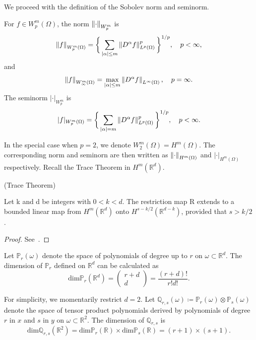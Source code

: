 We proceed with the definition of the Sobolev norm and seminorm.
\begin{defn}\label{def:sobolevnorm}
For $f \in W^m_p(\Omega)$, the norm $\left\lVert\cdot\right\rVert_{W^m_p}$ is
\begin{equation}
\left\lVert f\right\rVert_{W^m_p(\Omega)} = \bigg\{ \sum_{\lvert \alpha \rvert \leq m} \left\lVert D^\alpha f\right\rVert^p_{L^p(\Omega)} \bigg\}^{1/p}, \quad p < \infty,
\end{equation}
and 
\begin{equation}
\left\lVert f\right\rVert_{W^m_\infty(\Omega)} = \max_{\lvert \alpha \rvert \leq m} \left\lVert D^\alpha f\right\rVert_{L^\infty(\Omega)} , \quad p = \infty.
\end{equation}
The seminorm $\lvert \cdot \rvert_{W^m_p}$ is
\begin{equation}
\lvert f \rvert_{W^m_p(\Omega)} = \bigg\{ \sum_{\lvert \alpha \rvert = m} \left\lVert D^\alpha f\right\rVert^p_{L^p(\Omega)} \bigg\}^{1/p}, \quad p < \infty.
\end{equation}
\end{defn}
In the special case when $p=2$, we denote $W^m_2(\Omega) = H^m(\Omega)$. The corresponding norm and seminorn are then written as
$\left\lVert\cdot\right\rVert_{H^m(\Omega)}$ and $\lvert \cdot \rvert_{H^m(\Omega)}$ respectively.
Recall the Trace Theorem in $H^m(\mathbb{R}^d)$.
\begin{thm}\label{thm:tracethm}
(Trace Theorem)

Let k and d be integers with $0<k<d$. The restriction map R extends to a bounded linear map from $H^m(\mathbb{R}^d)$ onto
$H^{s-k/2}(\mathbb{R}^{d-k})$, provided that $s>k/2$.
\end{thm}
\begin{proof}
See~\cite{funcAna}.
\end{proof}

Let $\mathbb{P}_r(\omega)$ denote the space of polynomials of degree up to $r$
on $\omega \subset \mathbb{R}^d$. The dimension of $\mathbb{P}_r$ defined on 
$\mathbb{R}^d$ can be
calculated as
\begin{equation}\label{eq:dimpolynomial}
		  \text{dim}\mathbb{P}_r(\mathbb{R}^d) = \begin{pmatrix}
r+d \\
d
		  \end{pmatrix} = \frac{(r+d)!}{r!d!}.
\end{equation}

For simplicity, we momentarily restrict $d=2$. Let $\mathbb{Q}_{r,s}(\omega) \coloneq \mathbb{P}_r(\omega) \otimes \mathbb{P}_s(\omega)$ 
denote the space of tensor product polynomials
derived by polynomials of degree $r$ in $x$ and $s$ in $y$ 
on $\omega \subset \mathbb{R}^2$.
The dimension of $\mathbb{Q}_{r,s}$ is 
\begin{equation}
		  \text{dim}\mathbb{Q}_{r,s}(\mathbb{R}^2) = 
		  \text{dim} \mathbb{P}_r(\mathbb{R})\times 
		  \text{dim}\mathbb{P}_s(\mathbb{R}) = (r+1) \times (s+1).
\end{equation}

